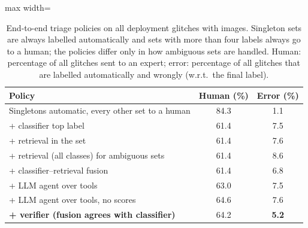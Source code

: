 \begin{table}[!htb]
\caption{End-to-end triage policies on all deployment glitches with images. Singleton sets are always labelled automatically
and sets with more than four labels always go to a human; the policies differ only in how ambiguous sets are handled. Human:
percentage of all glitches sent to an expert; error: percentage of all glitches that are labelled automatically and wrongly
(w.r.t.\ the final label).}\label{tab:e6pol}
\centering\scriptsize\setlength{\tabcolsep}{4pt}
\begin{adjustbox}{max width=\columnwidth}\begin{tabular}{lcc}\toprule
Policy & Human (\%) & Error (\%)\\\midrule
Singletons automatic, every other set to a human & 84.3 & 1.1\\
\midrule
+ classifier top label & 61.4 & 7.5\\
+ retrieval in the set & 61.4 & 7.6\\
+ retrieval (all classes) for ambiguous sets & 61.4 & 8.6\\
+ classifier--retrieval fusion & 61.4 & 6.8\\
+ LLM agent over tools & 63.0 & 7.5\\
+ LLM agent over tools, no scores & 64.6 & 7.6\\
\textbf{+ verifier (fusion agrees with classifier)} & 64.2 & \textbf{5.2}\\
\bottomrule
\end{tabular}\end{adjustbox}
\end{table}
